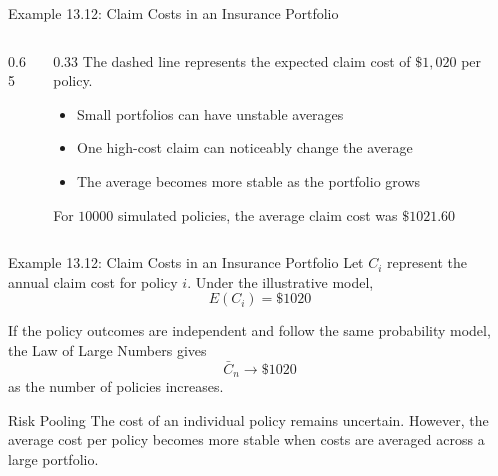 \documentclass[aspectratio=169]{beamer}
\begin{document}
\begin{frame}{Example 13.12: Claim Costs in an Insurance Portfolio}
\begin{columns}[T,onlytextwidth]
\begin{column}{0.65\textwidth}
\centering
{}
\end{column}

\begin{column}{0.33\textwidth}
The dashed line represents the expected claim cost of $\$1{,}020$ per policy.
\begin{itemize}
	\item Small portfolios can have unstable averages
	\item One high-cost claim can noticeably change the average
	\item The average becomes more stable as the portfolio grows
\end{itemize}

For $10000$ simulated policies, the average claim cost was $\$1021.60$
\end{column}
\end{columns}
\end{frame}

\begin{frame}{Example 13.12: Claim Costs in an Insurance Portfolio}
Let $C_i$ represent the annual claim cost for policy $i$. Under the illustrative model,
$$E(C_i)=\$1020$$

If the policy outcomes are independent and follow the same probability model, the Law of Large Numbers gives
$$\bar{C}_n\longrightarrow\$1020$$
as the number of policies increases.

\begin{block}{Risk Pooling}
The cost of an individual policy remains uncertain. However, the average cost per policy becomes more stable when costs are averaged across a large portfolio.
\end{block}
\end{frame}
\end{document}
